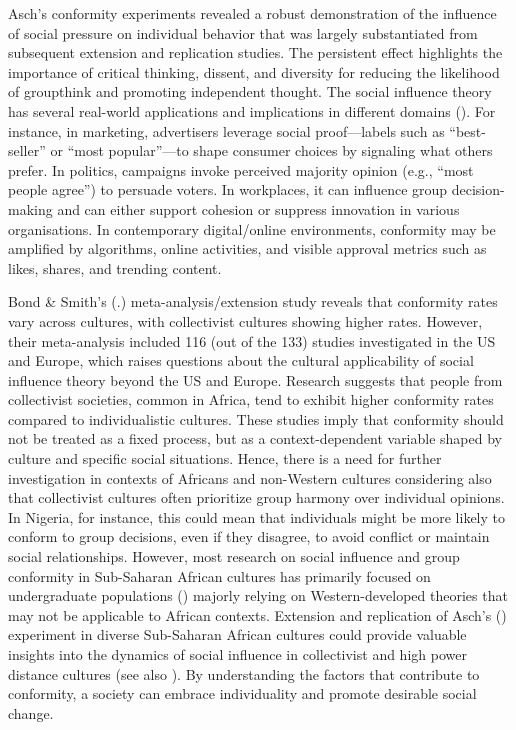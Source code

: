 \documentclass[
  letterpaper,
]{book}
\begin{document}
Asch's conformity experiments revealed a robust demonstration of the
influence of social pressure on individual behavior that was largely
substantiated from subsequent extension and replication studies. The
persistent effect highlights the importance of critical thinking,
dissent, and diversity for reducing the likelihood of groupthink and
promoting independent thought. The social influence theory has several
real-world applications and implications in different domains
(). For
instance, in marketing, advertisers leverage social proof---labels such
as ``best-seller'' or ``most popular''---to shape consumer choices by
signaling what others prefer. In politics, campaigns invoke perceived
majority opinion (e.g., ``most people agree'') to persuade voters. In
workplaces, it can influence group decision-making and can either
support cohesion or suppress innovation in various organisations. In
contemporary digital/online environments, conformity may be amplified by
algorithms, online activities, and visible approval metrics such as
likes, shares, and trending content.

Bond \& Smith's (.)
meta-analysis/extension study reveals that conformity rates vary across
cultures, with collectivist cultures showing higher rates. However,
their meta-analysis included 116 (out of the 133) studies investigated
in the US and Europe, which raises questions about the cultural
applicability of social influence theory beyond the US and Europe.
Research suggests that people from collectivist societies, common in
Africa, tend to exhibit higher conformity rates compared to
individualistic cultures. These studies imply that conformity should not
be treated as a fixed process, but as a context-dependent variable
shaped by culture and specific social situations. Hence, there is a need
for further investigation in contexts of Africans and non-Western
cultures considering also that collectivist cultures often prioritize
group harmony over individual opinions. In Nigeria, for instance, this
could mean that individuals might be more likely to conform to group
decisions, even if they disagree, to avoid conflict or maintain social
relationships. However, most research on social influence and group
conformity in Sub-Saharan African cultures has primarily focused on
undergraduate populations () majorly relying on Western-developed theories that may
not be applicable to African contexts. Extension and replication of
Asch's () experiment in diverse
Sub-Saharan African cultures could provide valuable insights into the
dynamics of social influence in collectivist and high power distance
cultures (see also ). By understanding the factors that contribute to conformity, a
society can embrace individuality and promote desirable social change.
\end{document}
